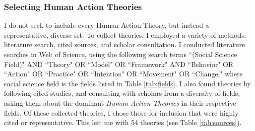 \documentclass[12 pt]{article}
\begin{document}
	\subsubsection{Selecting Human Action Theories}
	I do not seek to include every Human Action Theory, but instead a representative, diverse set. To collect theories, I employed a variety of methods: literature search,  cited sources,  and scholar consultation.  I conducted literature searches in Web of Science, using the following search terms ``(Social Science Field)" AND ``Theory" OR ``Model" OR ``Framework" AND ``Behavior" OR ``Action" OR ``Practice" OR ``Intention" OR ``Movement" OR ``Change,"  where social science field is the fields listed in Table \ref{tab:fields}.   I also found theories by following cited studies, and consulting with scholars from a diversity of fields, asking them about the dominant \textit{Human Action Theories} in their respective fields. Of these collected theories, I chose those for inclusion that were highly cited or representative. This left me with 54 theories (see Table \ref{tab:sources}). 
\end{document}
